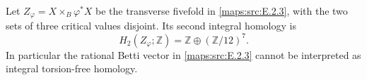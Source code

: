 \begin{proposition}\label{maps:src:E.2.5}


Let \(Z_\varphi=X\times_B\varphi^*X\) be the transverse
fivefold in \ref{maps:src:E.2.3}, with the two sets of three critical values
disjoint. Its second integral homology is
\[
 H_2(Z_\varphi;\mathbb Z)
   =\mathbb Z\oplus(\mathbb Z/12)^7.
\]
In particular the rational Betti vector in \ref{maps:src:E.2.3} cannot be
interpreted as integral torsion-free homology.
\end{proposition}


